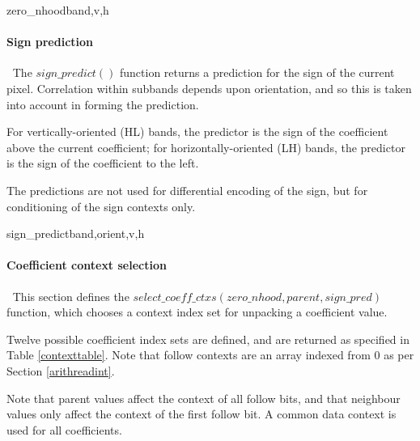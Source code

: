 \begin{pseudo}{zero\_nhood}{band,v,h}
    \bsRET{\false}
  \bsEND
      \bsRET{\false}
    \bsEND
  \bsEND
\bsELSE
      \bsRET{\false}
    \bsEND
  \bsEND
\bsEND
\bsRET{\true}
\end{pseudo}

\paragraph{Sign prediction}
\label{signpredict}
$\ $\newline
The $sign\_predict()$ function returns a prediction for the sign of the 
current pixel. Correlation within subbands depends upon orientation,
and so this is taken into account in forming the prediction.

For vertically-oriented (HL) bands, the predictor is the sign of the
coefficient above the current coefficient; for horizontally-oriented (LH)
bands, the predictor is the sign of the coefficient to the left. 

The predictions are not used for differential encoding of the sign, but for
conditioning of the sign contexts only.

\begin{pseudo}{sign\_predict}{band,orient,v,h}
  \bsELSE
  \bsEND
{}
  \bsELSE
  \bsEND
\bsELSE
\bsEND{}
\end{pseudo}

\paragraph{Coefficient context selection}
\label{selectcoeffcontext}
$\ $\newline
This section defines the $select\_coeff\_ctxs(zero\_nhood, parent, sign\_pred)$
function, which chooses a context index set for unpacking a coefficient value.

Twelve possible coefficient index sets are defined, and are returned as specified 
in Table \ref{contexttable}. Note that follow contexts are an array indexed from $0$
as per Section \ref{arithreadint}.

Note that parent values affect the context of all follow bits, and that neighbour
values only affect the context of the first follow bit. A common data context is used
for all coefficients.

